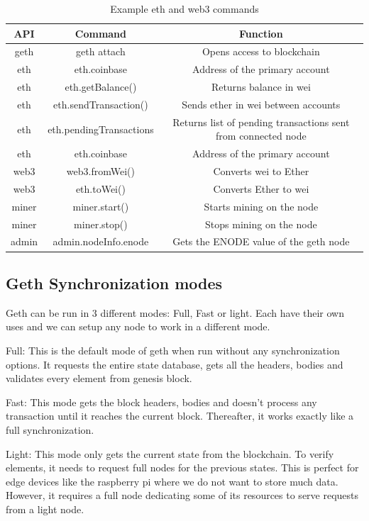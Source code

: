 \documentclass[11pt,openright]{report}
\begin{document}
\begin{table}[!htbp]
	\renewcommand{\arraystretch}{1.3}
	\caption{Example eth and web3 commands}
	\label{geth_commands}
	\centering
	\begin{tabular}{|c|c|c|}
		\hline
		\bfseries API & \bfseries Command & \bfseries Function \\
		\hline\hline
		geth & geth attach & Opens access to blockchain \\ \hline
		eth & eth.coinbase & Address of the primary account \\ \hline
		eth & eth.getBalance() & Returns balance in wei \\ \hline
        eth & eth.sendTransaction() & Sends ether in wei between accounts \\ \hline
        eth & eth.pendingTransactions & Returns list of pending transactions sent from connected node \\ \hline
        eth & eth.coinbase & Address of the primary account \\ \hline
        web3 & web3.fromWei() & Converts wei to Ether \\ \hline
        web3 & eth.toWei() & Converts Ether to wei \\ \hline
        miner & miner.start() & Starts mining on the node \\ \hline
        miner & miner.stop() & Stops mining on the node \\ \hline
        admin & admin.nodeInfo.enode & Gets the ENODE value of the geth node \\ \hline
	\end{tabular}
\end{table}

\subsection{Geth Synchronization modes}
Geth can be run in 3 different modes: Full, Fast or light. Each have their own uses and we can setup any node to work in a different mode. 

Full: This is the default mode of geth when run without any synchronization options. It requests the entire state database, gets all the headers, bodies and validates every element from genesis block.

Fast: This mode gets the block headers, bodies and doesn't process any transaction until it reaches the current block. Thereafter, it works exactly like a full synchronization.

Light: This mode only gets the current state from the blockchain. To verify elements, it needs to request full nodes for the previous states. This is perfect for edge devices like the raspberry pi where we do not want to store much data. However, it requires a full node dedicating some of its resources to serve requests from a light node.
\end{document}
